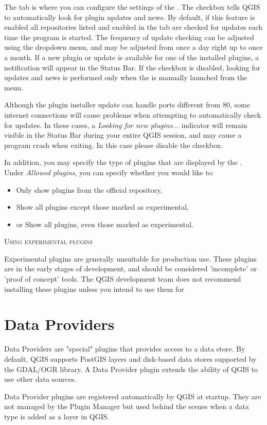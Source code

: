 
The  tab is where you can configure the settings of the . The  checkbox tells QGIS to automatically look for plugin updates and news. By default, if this feature is enabled all repositories listed and enabled in the  tab are checked for updates each time the program is started. The frequency of update checking can be adjusted using the dropdown menu, and may be adjusted from once a day right up to once a month. If a new plugin or update is available for one of the installed plugins, a notification will appear in the Status Bar. If the checkbox is disabled, looking for updates and news is performed only when the  is manually launched from the menu.

Although the plugin installer update can handle ports different from 80, some internet
connections will cause problems when attempting to automatically check for updates.
In these cases, a \textit{Looking for new plugins...} indicator will
remain visible in the Status Bar during your entire QGIS session, and may cause a
program crash when exiting. In this case please disable the checkbox.

In addition, you may specify the type of plugins that are displayed by the . Under \textit{Allowed plugins}, you can specify whether you would like to:

\begin{itemize}[label=--]
\item Only show plugins from the official repository,
\item Show all plugins except those marked as experimental,
\item or Show all plugins, even those marked as experimental.
\end{itemize}

\begin{Tip}
 \caption{\textsc{Using experimental plugins}}
Experimental plugins are generally unsuitable for production use. These plugins are in the early stages of development, and should be considered 'incomplete' or 'proof of concept' tools. The QGIS development team does not recommend installing these plugins unless you intend to use them for
\end{Tip}

\section{Data Providers}

Data Providers are "special" plugins that provides access to a data store.
By default, QGIS supports PostGIS layers and disk-based data stores supported by the GDAL/OGR library.
A Data Provider plugin extends the ability of QGIS to use other data sources.

Data Provider plugins are registered automatically by QGIS at startup.
They are not managed by the Plugin Manager but used behind the scenes when a data type is added as a layer in QGIS.

\FloatBarrier
